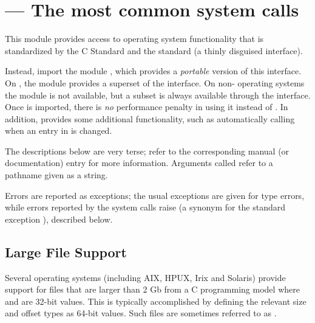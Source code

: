 \section{ ---
         The most common \POSIX{} system calls}



This module provides access to operating system functionality that is
standardized by the C Standard and the \POSIX{} standard (a thinly
disguised \UNIX{} interface).

  Instead, import the
module , which provides a \emph{portable} version of this
interface.  On \UNIX, the  module provides a superset of
the  interface.  On non-\UNIX{} operating systems the
 module is not available, but a subset is always
available through the  interface.  Once  is
imported, there is \emph{no} performance penalty in using it instead
of .  In addition, 
provides some additional functionality, such as automatically calling
 when an entry in  is changed.

The descriptions below are very terse; refer to the corresponding
\UNIX{} manual (or \POSIX{} documentation) entry for more information.
Arguments called  refer to a pathname given as a string.

Errors are reported as exceptions; the usual exceptions are given for
type errors, while errors reported by the system calls raise
 (a synonym for the standard exception
), described below.


\subsection{Large File Support \label{posix-large-files}}


Several operating systems (including AIX, HPUX, Irix and Solaris)
provide support for files that are larger than 2 Gb from a C
programming model where  and  are 32-bit
values. This is typically accomplished by defining the relevant size
and offset types as 64-bit values. Such files are sometimes referred
to as .

